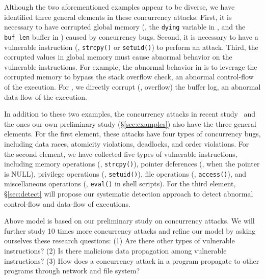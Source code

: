 Although the two aforementioned examples appear to be diverse, we have 
identified three general elements in these concurrency attacks. First, it is 
necessary to have corrupted global memory (\eg, the \texttt{dying} variable in 
\libsafe, and the \texttt{buf\_len} buffer in \apache) caused by concurrency 
bugs. Second, it is necessary to have a vulnerable instruction (\eg, 
\texttt{strcpy()} or 
\texttt{setuid()}) to perform an attack. Third, the corrupted values in global 
memory must cause abnormal behavior on the vulnerable instructions. For 
example, the abnormal behavior in \libsafe is to leverage the corrupted 
memory to bypass the stack overflow check, an abnormal control-flow of the 
execution. For \apache, we directly corrupt (\ie, overflow) the buffer 
log, an abnormal data-flow of the execution.

% 
In addition to these two examples, the \noldattacks concurrency 
attacks in recent study~\cite{con:hotpar12} and the \nattacks ones our own 
preliminary study (\S\ref{sec:examples}) also have the three general elements. 
For the first element, these attacks have four types of concurrency bugs, 
including data races, atomicity violations, deadlocks, and order violations. 
For the second element, we have collected five types of vulnerable 
instructions, including memory operations (\eg, \texttt{strcpy()}), pointer 
deferences (\eg, when the pointer is NULL), privilege operations (\eg, 
\texttt{setuid()}), file operations (\eg, \texttt{access()}), and miscellaneous 
operations (\eg, \texttt{eval()} in shell scripts). For the third element, 
\S\ref{sec:detect} will propose our systematic detection approach to detect 
abnormal control-flow and data-flow of executions.

 Above model is based on our preliminary study on \nattacks 
concurrency attacks. We will further study 10 times more concurrency attacks 
and refine our model by asking ourselves these research questions: (1) Are 
there other types of vulnerable instructions? (2) Is there malicious data 
propagation among vulnerable instructions? (3) How does a concurrency 
attack in a program propagate to other programs through network and file 
system?


